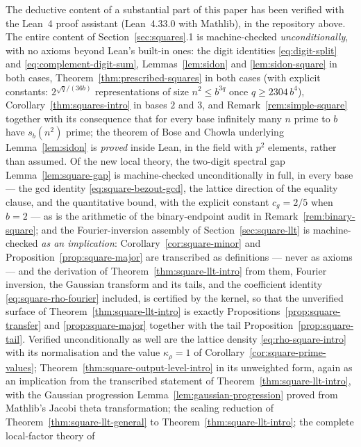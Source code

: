 \documentclass[11pt,reqno]{amsart}
\theoremstyle{plain}
\theoremstyle{definition}
\newcommand{\1}{\mathbf 1}
\begin{document}
The deductive content of a substantial part of this paper has been verified
with the Lean~4 proof assistant (Lean~4.33.0 with Mathlib), in the repository
above. The entire content of Section~\ref{sec:squares}.1 is machine-checked
\emph{unconditionally}, with no axioms beyond Lean's built-in ones: the digit
identities \eqref{eq:digit-split} and \eqref{eq:complement-digit-sum},
Lemmas~\ref{lem:sidon} and \ref{lem:sidon-square} in both cases,
Theorem~\ref{thm:prescribed-squares} in both cases (with explicit constants:
$2^{\sqrt q/(36b)}$ representations of size $n^2\le b^{3q}$ once
$q\ge 2304\,b^4$), Corollary~\ref{thm:squares-intro} in bases $2$ and $3$,
and Remark~\ref{rem:simple-square} together with its consequence that for
every base infinitely many $n$ prime to $b$ have $s_b(n^2)$ prime; the
theorem of Bose and Chowla underlying Lemma~\ref{lem:sidon} is \emph{proved}
inside Lean, in the field with $p^2$ elements, rather than assumed. Of the
new local theory, the two-digit spectral gap Lemma~\ref{lem:square-gap} is
machine-checked unconditionally in full, in every base --- the gcd identity
\eqref{eq:square-bezout-gcd}, the lattice direction of the equality clause,
and the quantitative bound, with the explicit constant $c_g=2/5$ when $b=2$
--- as is the arithmetic of the binary-endpoint audit in
Remark~\ref{rem:binary-square}; and the Fourier-inversion assembly of
Section~\ref{sec:square-llt} is machine-checked \emph{as an implication}:
Corollary~\ref{cor:square-minor} and Proposition~\ref{prop:square-major} are
transcribed as definitions --- never as axioms --- and the derivation of
Theorem~\ref{thm:square-llt-intro} from them, Fourier inversion, the
Gaussian transform and its tails, and the coefficient identity
\eqref{eq:square-rho-fourier} included, is certified by the kernel, so that
the unverified surface of Theorem~\ref{thm:square-llt-intro} is exactly
Propositions~\ref{prop:square-transfer} and \ref{prop:square-major} together
with the tail Proposition~\ref{prop:square-tail}. Verified unconditionally
as well are the lattice density \eqref{eq:rho-square-intro} with its
normalisation and the value $\kappa_{\rho}=1$ of
Corollary~\ref{cor:square-prime-values};
Theorem~\ref{thm:square-output-level-intro} in its unweighted form, again as
an implication from the transcribed statement of
Theorem~\ref{thm:square-llt-intro}, with the Gaussian progression
Lemma~\ref{lem:gaussian-progression} proved from Mathlib's Jacobi theta
transformation; the scaling reduction of Theorem~\ref{thm:square-llt-general}
to Theorem~\ref{thm:square-llt-intro}; the complete local-factor theory of
\end{document}
